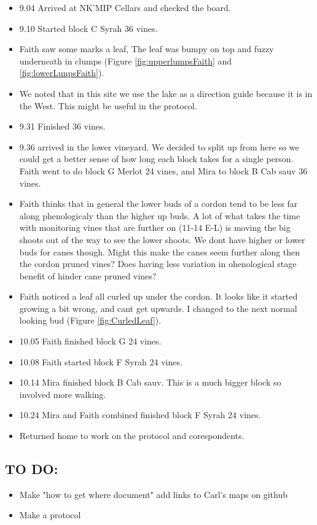 \documentclass[11pt,letter]{article}
\newenvironment{smitemize}{
\begin{itemize}
  \setlength{\itemsep}{0pt}
  \setlength{\parskip}{0.8pt}
  \setlength{\parsep}{0pt}}
{\end{itemize}
}
\begin{document}
\begin{smitemize}
\item 9.04 Arrived at NK'MIP Cellars and checked the board. 
\item 9.10 Started block C Syrah 36 vines.
\item Faith saw some marks a leaf, The leaf was bumpy on top and fuzzy underneath in clumps (Figure \ref{fig:upperlumpsFaith} and \ref{fig:lowerLunpsFaith}).
\item We noted that in this site we use the lake as a direction guide because it is in the West. This might be useful in the protocol. 
\item 9.31 Finished 36 vines.  
\item 9.36 arrived in the lower vineyard. We decided to split up from here so we could get a better sense of how long each block takes for a single person. Faith went to do block G Merlot 24 vines, and Mira to block B Cab sauv 36 vines. 
\item Faith thinks that in general the lower buds of a cordon tend to be less far along phenologicaly than the higher up buds. A lot of what takes the time with monitoring vines that are further on (11-14 E-L) is moving the big shoots out of the way to see the lower shoots. We dont have higher or lower buds for canes though. Might this make the canes seem further along then the cordon pruned vines? Does having less variation in ohenological stage benefit of hinder cane pruned vines?
\item Faith noticed a leaf all curled up under the cordon. It looks like it started growing a bit wrong, and cant get upwards. I changed to the next normal looking bud (Figure \ref{fig:CurledLeaf}).
\item 10.05 Faith finished block G 24 vines.
\item 10.08 Faith started block F Syrah 24 vines.
\item 10.14 Mira finished block B Cab sauv. This is a much bigger block so involved more walking. 
\item 10.24 Mira and Faith combined finished block F Syrah 24 vines.
\item Returned home to work on the protocol and corespondents. 

\end{smitemize}


\subsection{TO DO:}
\begin{smitemize}
\item Make "how to get where document" add links to Carl's maps on github
\item Make a protocol 

\end{smitemize}
\end{document}
